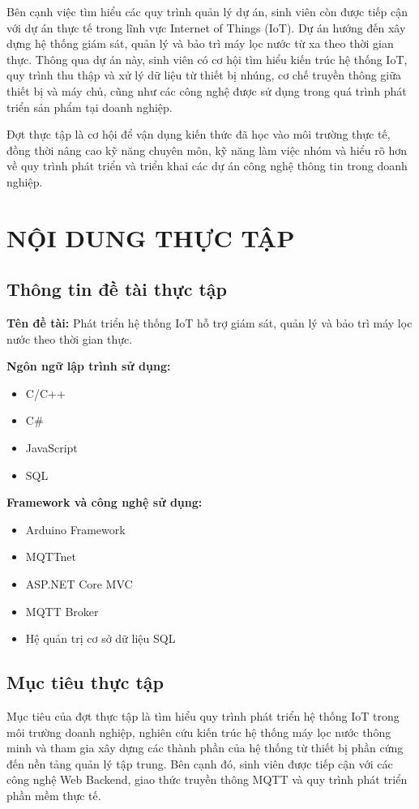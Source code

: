 Bên cạnh việc tìm hiểu các quy trình quản lý dự án, sinh viên còn được tiếp cận với dự án thực tế trong lĩnh vực Internet of Things (IoT). Dự án hướng đến xây dựng hệ thống giám sát, quản lý và bảo trì máy lọc nước từ xa theo thời gian thực. Thông qua dự án này, sinh viên có cơ hội tìm hiểu kiến trúc hệ thống IoT, quy trình thu thập và xử lý dữ liệu từ thiết bị nhúng, cơ chế truyền thông giữa thiết bị và máy chủ, cũng như các công nghệ được sử dụng trong quá trình phát triển sản phẩm tại doanh nghiệp.

Đợt thực tập là cơ hội để vận dụng kiến thức đã học vào môi trường thực tế, đồng thời nâng cao kỹ năng chuyên môn, kỹ năng làm việc nhóm và hiểu rõ hơn về quy trình phát triển và triển khai các dự án công nghệ thông tin trong doanh nghiệp.
\section{NỘI DUNG THỰC TẬP}

\subsection{Thông tin đề tài thực tập}

\textbf{Tên đề tài:} Phát triển hệ thống IoT hỗ trợ giám sát, quản lý và bảo trì máy lọc nước theo thời gian thực.

\textbf{Ngôn ngữ lập trình sử dụng:}
\begin{itemize}
    \item C/C++
    \item C\#
    \item JavaScript
    \item SQL
\end{itemize}

\textbf{Framework và công nghệ sử dụng:}
\begin{itemize}
    \item Arduino Framework
    \item MQTTnet
    \item ASP.NET Core MVC
    \item MQTT Broker
    \item Hệ quản trị cơ sở dữ liệu SQL
\end{itemize}

\subsection{Mục tiêu thực tập}

Mục tiêu của đợt thực tập là tìm hiểu quy trình phát triển hệ thống IoT trong môi trường doanh nghiệp, nghiên cứu kiến trúc hệ thống máy lọc nước thông minh và tham gia xây dựng các thành phần của hệ thống từ thiết bị phần cứng đến nền tảng quản lý tập trung. Bên cạnh đó, sinh viên được tiếp cận với các công nghệ Web Backend, giao thức truyền thông MQTT và quy trình phát triển phần mềm thực tế.

